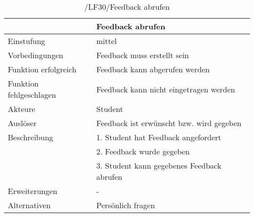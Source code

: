 	\begin{table}[H]
		\centering
		\caption{/LF30/Feedback abrufen}
		\begin{tabularx}{\textwidth}{l|X}
			\toprule
			                        &                           Feedback abrufen \\ \midrule
			             Einstufung &                                     mittel \\
			         Vorbedingungen &                Feedback muss erstellt sein \\
			   Funktion erfolgreich &             Feedback kann abgerufen werden \\
			Funktion fehlgeschlagen &     Feedback kann nicht eingetragen werden \\
			                Akteure &                                    Student \\
			               Auslöser &   Feedback ist erwünscht bzw. wird gegeben \\
			           Beschreibung &        1. Student hat Feedback angefordert \\
			                        &                  2. Feedback wurde gegeben \\
			                        & 3. Student kann gegebenes Feedback abrufen \\
			          Erweiterungen &                                          - \\
			           Alternativen &                          Persönlich fragen \\ \bottomrule
		\end{tabularx}%
		\label{tab:LF30holeFB}%
	\end{table}%
	
